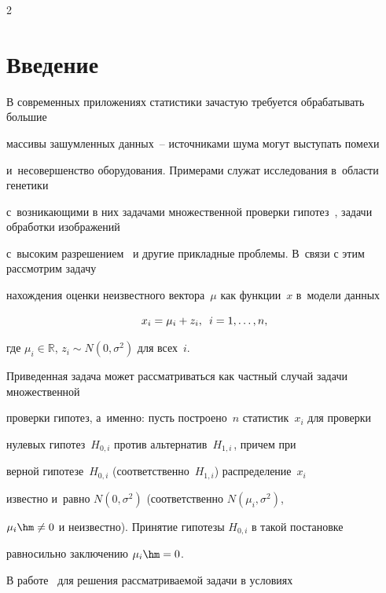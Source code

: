 \begin{multicols}{2}



\label{st\stat}





\section{Введение}





В современных приложениях статистики за\-час\-тую требуется обрабатывать большие 

массивы зашумленных данных~-- источниками шума могут выступать помехи 

и~несовершенство оборудования. Примерами служат исследования в~об\-ласти генетики 

с~возникающими в них задачами множественной проверки гипотез~\cite{MultipleTesting}, задачи обработки изображений 

с~высоким разрешением~\cite{FDRImage} и другие прикладные проб\-ле\-мы. В~связи с этим рассмотрим задачу 

нахождения оценки неизвестного вектора~$\mu$ как функции~$x$ в~модели данных

$$

x_i = \mu_i + z_i, \enskip i=1,\ldots,n,

$$

где $\mu_i\in\mathbb{R}$, $z_i \sim N(0,\sigma^2)$ для всех~$i$.



Приведенная задача может рассматриваться как частный случай задачи множественной 

проверки гипотез, а~именно: пусть построено~$n$ статистик~$x_i$ для проверки 

нулевых гипотез~$H_{0,i}$ против альтернатив~$H_{1,i\,}$, причем при 

верной гипотезе~$H_{0, i}$ (соответственно~$H_{1, i}$) распределение~$x_i$ 

известно и~равно $N(0,\sigma^2)$ (соответственно $N(\mu_i,\sigma^2)$, 

$\mu_i\hm\neq0$ и неизвестно). Принятие гипотезы $H_{0,i}$ в такой постановке 

равносильно заключению $\mu_i\hm=0$.



В работе~\cite{AdaptingFDR} для решения рассматриваемой задачи в условиях 


\end{multicols}
